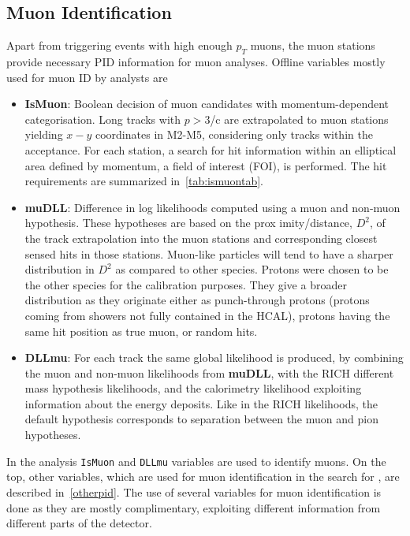 \subsection{Muon Identification }
\label{muonID}
Apart from triggering events with high enough $p_{T}$ muons, the muon stations provide necessary \gls{PID} information for muon analyses. Offline variables mostly used for muon ID by analysts are
\begin{itemize}
	\item{\textbf{IsMuon}: Boolean decision of muon candidates with momentum-dependent categorisation. Long tracks with $p>3$\gev/c are extrapolated to muon stations yielding $x-y$ coordinates in M2-M5, considering only tracks within the acceptance. For each station, a search for hit information within an elliptical area defined by momentum, a field of interest (\Gls{FOI}), is performed. The hit requirements are summarized in~\autoref{tab:ismuontab}.}
	\item{\textbf{muDLL}: Difference in log likelihoods computed using a muon and non-muon hypothesis. These hypotheses are based on the prox imity/distance, $D^{2}$, of the track extrapolation into the muon stations and corresponding closest sensed hits in those stations. Muon-like particles will tend to have a sharper distribution in $D^{2}$ as compared to other species. Protons were chosen to be the other species for the calibration purposes. They give a broader distribution as they originate either as punch-through protons (protons coming from showers not fully contained in the \gls{HCAL}), protons having the same hit position as true muon, or random hits.}
	\item{\textbf{DLLmu}}:  For each track the same global likelihood is produced, by combining the muon and non-muon likelihoods from \textbf{muDLL}, with the \Gls{RICH} different mass hypothesis likelihoods, and the calorimetry likelihood exploiting information about the energy deposits. Like in the \Gls{RICH} likelihoods, the default hypothesis corresponds to separation between the muon and pion hypotheses.    

\end{itemize}

\noindent In the \Bmumumu analysis \texttt{IsMuon} and \texttt{DLLmu} variables are used to identify muons. On the top, other variables, which are used for muon identification in the search for \Bmumumu, are described in~\autoref{otherpid}. The use of several variables for muon identification is done as they are mostly complimentary, exploiting different information from different parts of the detector. 

